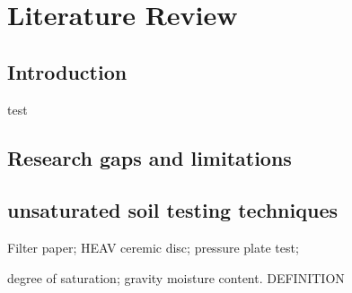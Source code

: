 \chapter{Literature Review}
\label{chap:two}

\section{Introduction}

test

\section{Research gaps and limitations}


\section{unsaturated soil testing techniques}
Filter paper;
HEAV ceremic disc;
pressure plate test;

degree of saturation; gravity moisture content. DEFINITION


